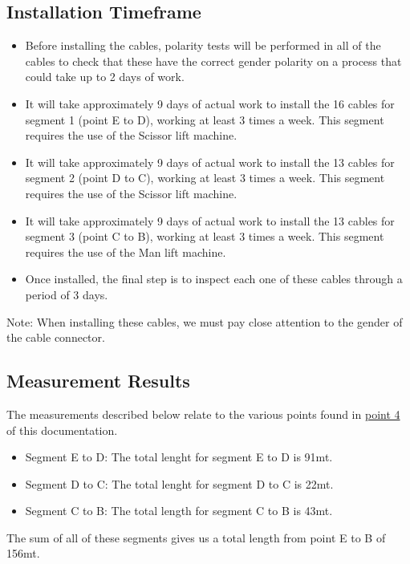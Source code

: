 \newpage

  \subsection{Installation Timeframe}
  \begin{itemize}
    \item Before installing the cables, polarity tests will be performed in all of the cables to check that these have the correct gender polarity on a process that could take up to 2 days of work.  
  
    \item It will take approximately 9 days of actual work to install the 16 cables for segment 1 (point E to D), working at least 3 times a week. This segment requires the use of the Scissor lift machine. 
  
    \item It will take approximately 9 days of actual work to install the 13 cables for segment 2 (point D to C), working at least 3 times a week. This segment requires the use of the Scissor lift machine.
  
    \item It will take approximately 9 days of actual work to install the 13 cables for segment 3 (point C to B), working at least 3 times a week. This segment requires the use of the Man lift machine.
  
    \item Once installed, the final step is to inspect each one of these cables through a period of 3 days. 
  \end{itemize}
  Note: When installing these cables, we must pay close attention to the gender of the cable connector.

\newpage

  \subsection{Measurement Results}
  
  The measurements described below relate to the various points found in \hyperref[sec:disconnectpoints]{point 4} of this documentation.
  
  \begin{itemize}
    \item Segment E to D: The total lenght for segment E to D is 91mt.
    \item Segment D to C: The total lenght for segment D to C is 22mt.
    \item Segment C to B: The total length for segment C to B is 43mt.
  \end{itemize}
  The sum of all of these segments gives us a total length from point E to B of 156mt.
